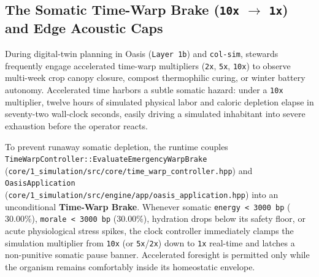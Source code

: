 \subsection{The Somatic Time-Warp Brake (\texttt{10x} $\to$ \texttt{1x}) and Edge Acoustic Caps}

During digital-twin planning in Oasis (\texttt{Layer 1b}) and \texttt{col-sim}, stewards frequently engage accelerated time-warp multipliers (\texttt{2x}, \texttt{5x}, \texttt{10x}) to observe multi-week crop canopy closure, compost thermophilic curing, or winter battery autonomy. Accelerated time harbors a subtle somatic hazard: under a \texttt{10x} multiplier, twelve hours of simulated physical labor and caloric depletion elapse in seventy-two wall-clock seconds, easily driving a simulated inhabitant into severe exhaustion before the operator reacts.

To prevent runaway somatic depletion, the runtime couples \texttt{TimeWarpController::EvaluateEmergencyWarpBrake} (\texttt{core/1\_simulation/src/core/time\_warp\_controller.hpp}) and \texttt{OasisApplication} (\texttt{core/1\_simulation/src/engine/app/oasis\_application.hpp}) into an unconditional \textbf{Time-Warp Brake}. Whenever somatic \texttt{energy < 3000 bp} ($30.00\%$), \texttt{morale < 3000 bp} ($30.00\%$), hydration drops below its safety floor, or acute physiological stress spikes, the clock controller immediately clamps the simulation multiplier from \texttt{10x} (or \texttt{5x}/\texttt{2x}) down to \texttt{1x} real-time and latches a non-punitive somatic pause banner. Accelerated foresight is permitted only while the organism remains comfortably inside its homeostatic envelope.

